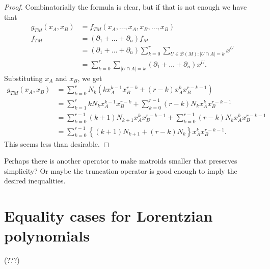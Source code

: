 \documentclass[12pt]{article}
\begin{document}
\begin{proof}
	Combinatorially the formula is clear, but if that is not enough we have that 
	\begin{align*}
		g_{TM}(x_A, x_B) & = f_{TM}(x_A, \ldots, x_A, x_B, \ldots, x_B) \\
		f_{TM} & = (\partial_1 + \ldots + \partial_n) f_M \\
		& = (\partial_1 + \ldots + \partial_n) \sum_{k = 0}^r \sum_{U \in \mathcal{B}(M): |U \cap A| = k} x^U \\
		& = \sum_{k = 0}^r \sum_{|U \cap A| = k} (\partial_1 + \ldots + \partial_n) x^U. 
	\end{align*}
	Substituting $x_A$ and $x_B$, we get 
	\begin{align*}
		g_{TM}(x_A, x_B) & = \sum_{k = 0}^r N_k (kx_A^{k-1} x_B^{r-k} + (r-k)x_A^k x_B^{r-k-1}) \\
		& = \sum_{k = 1}^r k N_k x_A^{k-1} x_B^{r-k} + \sum_{k = 0}^{r-1} (r-k)N_k x_A^k x_B^{r-k-1} \\
		& = \sum_{k = 0}^{r-1} (k+1)N_{k+1} x_A^k x_B^{r-k-1} + \sum_{k =0}^{r-1} (r-k) N_k x_A^k x_B^{r-k-1} \\
		& = \sum_{k = 0}^{r-1} \left \{ (k+1)N_{k+1} + (r-k) N_k\right \} x_A^k x_B^{r-k-1}.
	\end{align*}
	This seems less than desirable.
\end{proof}
Perhaps there is another operator to make matroids smaller that preserves simplicity? Or maybe the truncation operator is good enough to imply the desired inequalities. 

\section{Equality cases for Lorentzian polynomials}

(???)



\end{document}
